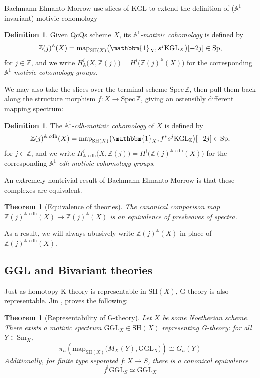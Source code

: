 \documentclass[11pt, twoside]{article}
\numberwithin{equation}{section}
\newtheorem{theorem}[equation]{Theorem}
\theoremstyle{definition}
\newtheorem{definition}[equation]{Definition}
\newcommand{\bb}[1]{\mathbb{#1}}
\newcommand{\spec}{\mathrm{Spec} \,}
\newcommand{\map}{\mathrm{map}}
\newcommand{\Kgl}{\mathrm{KGL}}
\newcommand{\Ggl}{\mathrm{GGL}}
\newcommand{\sh}{\mathrm{SH}}
\newcommand{\Sp}{\mathrm{Sp}}
\newcommand{\sm}{\mathrm{Sm}}
\newcommand{\G}{\mathrm{G}}
\begin{document}
Bachmann-Elmanto-Morrow use slices of \(\Kgl\) to extend the definition of (\(\bb{A}^1\)-invariant) motivic cohomology

\begin{definition} Given QcQs scheme \(X\), its \emph{\(\bb{A}^1\)-motivic cohomology} is defined by 
\[\bb{Z}(j)^\bb{A}(X) = \map_{\sh(X)}\big(\mathbbm{1}_X, s^j \Kgl_X\big)[- 2j] \in \Sp,\]
for \(j \in \bb{Z}\), and we write \(H_\bb{A}^i\big(X, \bb{Z}(j)\big) = H^i\big(\bb{Z}(j)^\bb{A}(X)\big)\) for the corresponding \emph{\(\bb{A}^1\)-motivic cohomology groups}.
\end{definition}

We may also take the slices over the terminal scheme \(\spec \bb{Z}\), then pull them back along the structure morphism \(f \colon X \to \spec \bb{Z}\), giving an ostensibly different mapping spectrum:

\begin{definition} The \emph{\(\bb{A}^1\)-cdh-motivic cohomology} of \(X\) is defined by 
\[\bb{Z}(j)^{\bb{A}, \mathrm{cdh}}(X) = \map_{\sh(X)}\big(\mathbbm{1}_X, f^* s^j \Kgl_\bb{Z}\big)[- 2j] \in \Sp,\]
for \(j \in \bb{Z}\), and we write \(H_{\bb{A}, \mathrm{cdh}}^i\big(X, \bb{Z}(j)\big) = H^i\big(\bb{Z}(j)^{\bb{A}, \mathrm{cdh}}(X)\big)\) for the corresponding \emph{\(\bb{A}^1\)-cdh-motivic cohomology groups}.
\end{definition}

An extremely nontrivial result of Bachmann-Elmanto-Morrow \cite[Theorem 9.3 (2)]{BEM} is that these complexes are equivalent.

\begin{theorem}[Equivalence of theories] The canonical comparison map \(\bb{Z}(j)^{\bb{A}, \mathrm{cdh}}(X) \to \bb{Z}(j)^\bb{A}(X)\) is an equivalence of presheaves of spectra. 
\end{theorem}

As a result, we will always abusively write \(\bb{Z}(j)^\bb{A}(X)\) in place of \(\bb{Z}(j)^{\bb{A}, \mathrm{cdh}}(X)\).

\subsection{GGL and Bivariant theories}

Just as homotopy K-theory is representable in \(\sh(X)\), \(\G\)-theory is also representable. Jin \cite[Corollary 2.2.16]{Jin}, proves the following: 

\begin{theorem}[Representability of G-theory] Let \(X\) be some Noetherian scheme. There exists a motivic spectrum \(\Ggl_X \in \sh(X)\) representing G-theory: for all \(Y \in \sm_X\), 
\[\pi_n \! \left(\map_{\sh(X)}\big(M_X(Y), \Ggl_X\big)\right) \cong G_n(Y)\]
Additionally, for finite type separated \(f \colon X \to S\), there is a canonical equivalence
\begin{equation}\label{eq:G-shriek}
f^! \Ggl_S \simeq \Ggl_X
\end{equation}
\end{theorem}
\end{document}
